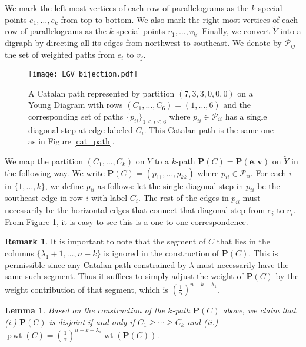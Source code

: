\documentclass[11pt]{article}
\numberwithin{equation}{section}
\theoremstyle{plain}
\newtheorem{lemma}[thm]{Lemma}
\theoremstyle{definition}
\newtheorem{rem}{Remark}[section]
\theoremstyle{remark}
\DeclareMathOperator{\wt}{wt}
\DeclareMathOperator{\pwt}{p\,wt}
\begin{document}
We mark the left-most vertices of each row of parallelograms as the $k$ special points $e_1,\ldots,e_k$ from top to bottom. We also mark the right-most vertices of each row of parallelograms as the $k$ special points $v_1,\ldots,v_k$. Finally, we convert $\tilde{Y}$ into a digraph by directing all its edges from northwest to southeast. We denote by $\mathcal{P}_{ij}$ the set of weighted paths from $e_i$ to $v_j$.


\begin{figure}[h]
\centering
\texttt{[image: LGV\_bijection.pdf]}
\caption{A Catalan path represented by partition $(7,3,3,0,0,0)$ on a Young Diagram with rows $(C_1,\ldots,C_6)=(1,\ldots,6)$ and the corresponding set of paths $\{p_{ii}\}_{1 \leq i \leq 6}$ where $p_{ii} \in \mathcal{P}_{ii}$ has a single diagonal step at edge labeled $C_i$. This Catalan path is the same one as in Figure \ref{cat_path}.}
\noindent
\label{LGV_bijection}
\end{figure}

We map the partition $(C_1,\ldots,C_k)$ on $Y$ to a $k$-path $\textbf{P}(C) = \textbf{P}(\textbf{e},\textbf{v})$ on $\tilde{Y}$ in the following way. We write $\textbf{P}(C) = (p_{11},\ldots,p_{kk})$ where $p_{ii} \in \mathcal{P}_{ii}$. For each $i$ in $\{1,\ldots,k\}$, we define $p_{ii}$ as follows: let the single diagonal step in $p_{ii}$ be the southeast edge in row $i$ with label $C_i$. The rest of the edges in $p_{ii}$ must necessarily be the horizontal edges that connect that diagonal step from $e_i$ to $v_i$. From Figure \ref{LGV_bijection}, it is easy to see this is a one to one correspondence. 

\begin{rem} \label{segment}
It is important to note that the segment of $C$ that lies in the columns $\{\lambda_1+1,\ldots,n-k\}$ is ignored in the construction of $\textbf{P}(C)$. This is permissible since any Catalan path constrained by $\lambda$ must necessarily have the same such segment. Thus it suffices to simply adjust the weight of $\textbf{P}(C)$ by the weight contribution of that segment, which is $\left(\frac{1}{\alpha}\right)^{n-k-\lambda_1}$. %
\end{rem}

\begin{lemma} Based on the construction of the $k$-path $\textbf{P}(C)$ above, we claim that (i.) $\textbf{P}(C)$ is disjoint if and only if $C_1 \geq \cdots \geq C_k$ and (ii.) $\pwt(C) = \left(\frac{1}{\alpha}\right)^{n-k-\lambda_1} \wt(\textbf{P}(C))$.

\end{lemma}
\end{document}
